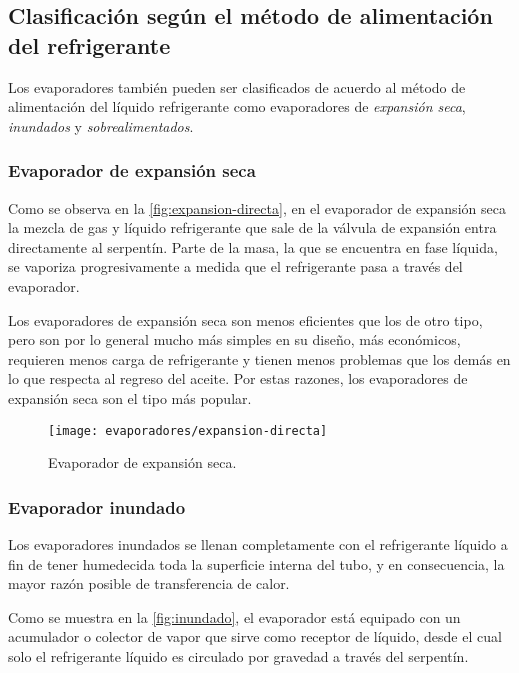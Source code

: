 	\subsection{Clasificación según el método de alimentación del refrigerante}
		
		Los evaporadores también pueden ser clasificados de acuerdo al método de alimentación del líquido refrigerante como evaporadores de \emph{expansión seca}, \emph{inundados} y \emph{sobrealimentados}.
		
		
			\subsubsection{Evaporador de expansión seca}
				
				Como se observa en la \autoref{fig:expansion-directa}, en el evaporador de expansión seca la mezcla de gas y líquido refrigerante que sale de la válvula de expansión entra directamente al serpentín. Parte de la masa, la que se encuentra en fase líquida, se vaporiza progresivamente a medida que el refrigerante pasa a través del evaporador.
			
			
				Los evaporadores de expansión seca son menos eficientes que los de otro tipo, pero son por lo general mucho más simples en su diseño, más económicos, requieren menos carga de refrigerante y tienen menos problemas que los demás en lo que respecta al regreso del aceite. Por estas razones, los evaporadores de expansión seca son el tipo más popular.
				
				
				\begin{figure}[h]
					\centering
					\texttt{[image: evaporadores/expansion-directa]}
					\caption{Evaporador de expansión seca.}
					\label{fig:expansion-directa}
				\end{figure}
		
		
			\subsubsection{Evaporador inundado}
			
				Los evaporadores inundados se llenan completamente con el refrigerante líquido a fin de tener humedecida toda la superficie interna del tubo, y en consecuencia, la mayor razón posible de transferencia de calor.
				
				Como se muestra en la \autoref{fig:inundado}, el evaporador está equipado con un acumulador o colector de vapor que sirve como receptor de líquido, desde el cual solo el refrigerante líquido es circulado por gravedad a través del serpentín. 
				
